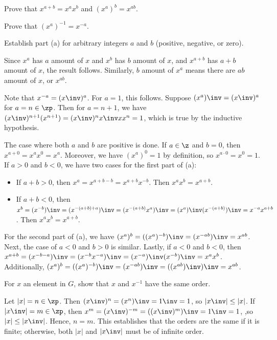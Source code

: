 \begin{problems}
\begin{problems}
        \item Prove that $x^{a+b} = x^a x^b$ and $(x^a)^b = x^{ab}$.
        \item Prove that $(x^a)^{-1} = x^{-a}$.
        \item Establish part (a) for arbitrary integers $a$ and $b$ (positive, negative, or zero).
    \end{problems}
    \begin{solalph}
        \item Since $x^a$ has $a$ amount of $x$ and $x^b$ has $b$ amount of $x$, and $x^{a + b}$ has $a + b$ amount of $x$, the result follows. Similarly, $b$ amount of $x^a$ means there are $ab$ amount of $x$, or $x^{ab}$.
        \item Note that $x^{-a} = (x\inv)^a$. For $a = 1$, this follows. Suppose $(x^a)\inv = (x\inv)^a$ for $a = n \in \zp$. Then for $a = n + 1$, we have
        $(x\inv)^{n + 1}(x^{n + 1}) = (x\inv)^n x\inv xx^n = 1$, which is true by the inductive hypothesis.
        \item The case where both $a$ and $b$ are positive is done. If $a \in \z$ and $b = 0$, then $x^{a + 0} = x^ax^0 = x^a$. Moreover, we have $(x^a)^0 = 1$ by definition, so $x^{a \cdot 0} = x^0 = 1$. If $a > 0$ and $b < 0$, we have two cases for the first part of (a):
        \begin{itemize}
            \item If $a + b > 0$, then $x^a = x^{a + b - b} = x^{a + b}x^{-b}$. Then $x^ax^b = x^{a + b}$.
            \item If $a + b < 0$, then $x^b = (x^{-b})\inv = (x^{- (a + b) + a})\inv = (x^{-(a + b)}x^a)\inv = (x^a)\inv(x^{-(a + b)})\inv = x^{-a}x^{a + b}$. Then $x^ax^b = x^{a + b}$.
        \end{itemize}
        For the second part of (a), we have $(x^a)^b = ((x^a)^{-b})\inv = (x^{-ab})\inv = x^{ab}$. Next, the case of $a < 0$ and $b > 0$ is similar. Lastly, if $a < 0$ and $b < 0$, then $x^{a + b} = (x^{-b - a})\inv = (x^{-b}x^{-a})\inv = (x^{-a})\inv(x^{-b})\inv = x^ax^b$. Additionally, $(x^a)^b = ((x^a)^{-b})\inv = (x^{-ab})\inv = ((x^{ab})\inv)\inv = x^{ab}$.
    \end{solalph}
    \item For $x$ an element in $G$, show that $x$ and $x^{-1}$ have the same order.
    \begin{sol}
        Let $|x| = n \in \zp$. Then $(x\inv)^n = (x^n)\inv = 1\inv = 1$, so $|x\inv| \leq |x|$. If $|x\inv| = m \in \zp$, then $x^m = (x\inv)^{-m} = ((x\inv)^m)\inv = 1\inv = 1$, ,so $|x| \leq |x\inv|$. Hence, $n = m$. This establishes that the orders are the same if it is finite; otherwise, both $|x|$ and $|x\inv|$ must be of infinite order.

\end{sol}
\end{problems}
